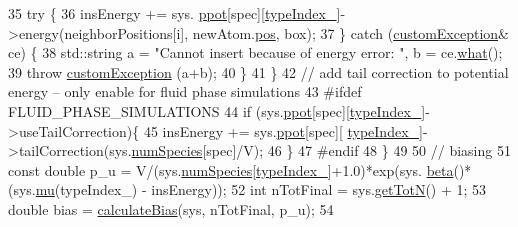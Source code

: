 \begin{DoxyCode}
35                                                 \textcolor{keywordflow}{try} \{
36                                                                 insEnergy += sys.
      \hyperlink{classsim_system_a8d6271751a62f61edcf57f773540a4a3}{ppot}[spec][\hyperlink{classmc_move_acb731965547b0326ef318ec96da8b46a}{typeIndex\_}]->energy(neighborPositions[i], newAtom.\hyperlink{classatom_a3ae5f4880e7831d8b2c9fda72b4eb24a}{pos}, box);        
37                                                 \} \textcolor{keywordflow}{catch} (\hyperlink{classcustom_exception}{customException}& ce) \{
38                                                                 std::string a = \textcolor{stringliteral}{"Cannot insert because of
       energy error: "}, b = ce.\hyperlink{classcustom_exception_aeb6ab5848b038adfc68fde86a512f691}{what}();
39                                                                 \textcolor{keywordflow}{throw} 
      \hyperlink{classcustom_exception}{customException} (a+b);
40                                                 \}
41         \}
42         \textcolor{comment}{// add tail correction to potential energy -- only enable for fluid phase simulations}
43 \textcolor{preprocessor}{#ifdef FLUID\_PHASE\_SIMULATIONS}
44         \textcolor{keywordflow}{if} (sys.\hyperlink{classsim_system_a8d6271751a62f61edcf57f773540a4a3}{ppot}[spec][\hyperlink{classmc_move_acb731965547b0326ef318ec96da8b46a}{typeIndex\_}]->useTailCorrection)\{
45                                                 insEnergy += sys.\hyperlink{classsim_system_a8d6271751a62f61edcf57f773540a4a3}{ppot}[spec][
      \hyperlink{classmc_move_acb731965547b0326ef318ec96da8b46a}{typeIndex\_}]->tailCorrection(sys.\hyperlink{classsim_system_a9eea865e6dc1cff377b1e79c4d9c23f0}{numSpecies}[spec]/V);
46                                 \}
47 \textcolor{preprocessor}{#endif}
48     \}
49     
50     \textcolor{comment}{// biasing}
51     \textcolor{keyword}{const} \textcolor{keywordtype}{double} p\_u = V/(sys.\hyperlink{classsim_system_a9eea865e6dc1cff377b1e79c4d9c23f0}{numSpecies}[\hyperlink{classmc_move_acb731965547b0326ef318ec96da8b46a}{typeIndex\_}]+1.0)*exp(sys.
      \hyperlink{classsim_system_a3eeec9678902f8d7fce4dad6064aaf4c}{beta}()*(sys.\hyperlink{classsim_system_af1e3f5320aff976a448647244d5950d1}{mu}(typeIndex\_) - insEnergy));
52     \textcolor{keywordtype}{int} nTotFinal = sys.\hyperlink{classsim_system_a37dd827f4057049763351510147b9f1d}{getTotN}() + 1;
53     \textcolor{keywordtype}{double} bias = \hyperlink{system_8cpp_ab912bbb9fc9045954cf1b3ccb286a55c}{calculateBias}(sys, nTotFinal, p\_u);
54    

\end{DoxyCode}
